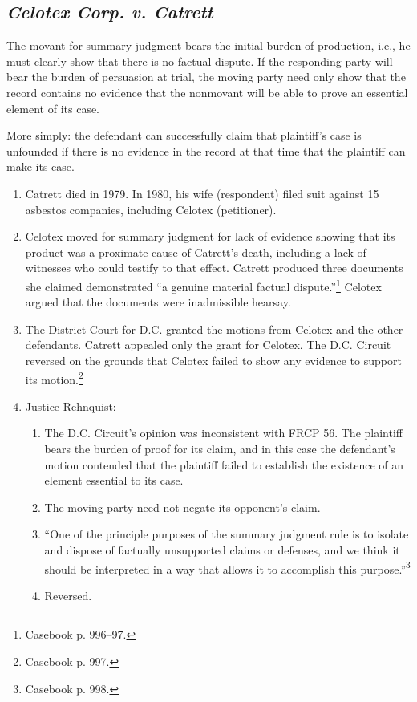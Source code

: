 \subsection{\emph{Celotex Corp. v. Catrett}}

The movant for summary judgment bears the initial burden of production, i.e., 
he must clearly show that there is no factual dispute. If the responding party 
will bear the burden of persuasion at trial, the moving party need only show 
that the record contains no evidence that the nonmovant will be able to prove 
an essential element of its case.

More simply: the defendant can successfully claim that plaintiff's case is 
unfounded if there is no evidence in the record at that time that the 
plaintiff can make its case.

\begin{enumerate}
    \item Catrett died in 1979. In 1980, his wife (respondent) filed suit 
    against 15 asbestos companies, including Celotex (petitioner).
    \item Celotex moved for summary judgment for lack of evidence showing that 
    its product was a proximate cause of Catrett's death, including a lack of 
    witnesses who could testify to that effect. Catrett produced three 
    documents she claimed demonstrated ``a genuine material factual 
    dispute.''\footnote{Casebook p. 996--97.} Celotex argued that the 
    documents were inadmissible hearsay.
    \item The District Court for D.C. granted the motions from Celotex and the 
    other defendants. Catrett appealed only the grant for Celotex. The D.C. 
    Circuit reversed on the grounds that Celotex failed to show any evidence 
    to support its motion.\footnote{Casebook p. 997.}
    \item Justice Rehnquist:
    \begin{enumerate}
        \item The D.C. Circuit's opinion was inconsistent with FRCP 56. The 
        plaintiff bears the burden of proof for its claim, and in this case 
        the defendant's motion contended that the plaintiff failed to 
        establish the existence of an element essential to its case.
        \item The moving party need not negate its opponent's claim.
        \item ``One of the principle purposes of the summary judgment rule is 
        to isolate and dispose of factually unsupported claims or defenses, 
        and we think it should be interpreted in a way that allows it to 
        accomplish this purpose.''\footnote{Casebook p. 998.}
        \item Reversed.
    \end{enumerate}
\end{enumerate}

